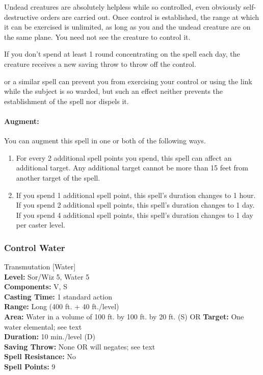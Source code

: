 Undead creatures are absolutely helpless while so controlled, even obviously self-destructive orders are carried out. 
Once control is established, the range at which it can be exercised is unlimited, as long as you and the undead creature are on the same plane. 
You need not see the creature to control it.

If you don't spend at least 1 round concentrating on the spell each day, the creature receives a new saving throw to throw off the control.

 or a similar spell can prevent you from exercising your control or using the link while the subject is so warded, 
but such an effect neither prevents the establishment of the spell nor dispels it.

\paragraph{Augment:} You can augment this spell in one or both of the following ways.
\begin{enumerate}
 \item For every 2 additional spell points you spend, this spell can affect an additional target. 
 Any additional target cannot be more than 15 feet from another target of the spell.
 \item If you spend 1 additional spell point, this spell's duration changes to 1 hour.
 If you spend 2 additional spell points, this spell's duration changes to 1 day. 
 If you spend 4 additional spell points, this spell's duration changes to 1 day per caster level.
\end{enumerate}
\subsubsection{Control Water}
\label{Spell:ControlWater}
Transmutation [Water]
\\ \textbf{Level:} Sor/Wiz 5, Water 5
\\ \textbf{Components:} V, S
\\ \textbf{Casting Time:} 1 standard action
\\ \textbf{Range:} Long (400 ft. + 40 ft./level)
\\ \textbf{Area:} Water in a volume of 100 ft. by 100 ft. by 20 ft. (S) OR \textbf{Target:} One water elemental; see text
\\ \textbf{Duration:} 10 min./level (D)
\\ \textbf{Saving Throw:} None OR will negates; see text
\\ \textbf{Spell Resistance:} No
\\ \textbf{Spell Points:} 9

